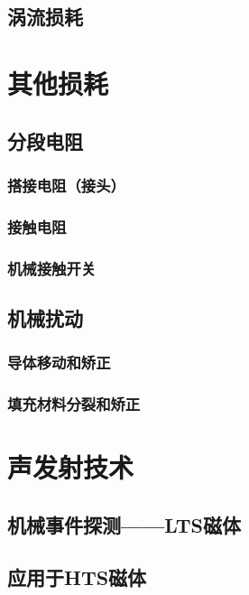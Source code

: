 \subsection{涡流损耗}

\section{其他损耗}

\subsection{分段电阻}

\subsubsection*{搭接电阻（接头）}

\subsubsection*{接触电阻}

\subsubsection*{机械接触开关}

\subsection{机械扰动}

\subsubsection*{导体移动和矫正}

\subsubsection*{填充材料分裂和矫正}

\section{声发射技术}
\subsection{机械事件探测——LTS磁体}

\subsection{应用于HTS磁体}

